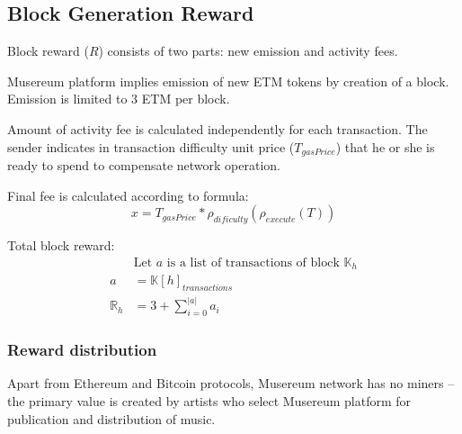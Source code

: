 \documentclass[12pt]{report}
\begin{document}
\begin{figure}[H]
\end{figure}

\vfill\null\pagebreak

\subsection{Block Generation Reward}
\label{tech-blockchain-reward}
\begin{multicols}{2}
Block reward ($R$) consists of two parts: new emission and activity fees.

Musereum platform implies emission of new ETM tokens by creation of a block. Emission is limited to 3 ETM per block.

Amount of activity fee is calculated independently for each transaction. The sender indicates in transaction difficulty unit price ($T_{gasPrice}$) that he or she is ready to spend to compensate network operation.

Final 	fee is calculated according to formula:
\begin{equation}
x = T_{gasPrice} * \rho_{dificulty}(\rho_{execute}(T))
\end{equation}

Total block reward:
\begin{align}
&\text{Let } a \text{ is a list of transactions of block } \mathbb{K}_h \\
a &= \mathbb{K}[h]_{transactions} \\
\mathbb{R}_h &= 3 + \sum\limits_{i=0}^{|a|} a_i
\end{align}
\end{multicols}

\subsubsection{Reward distribution}
\label{tech-blockchain-reward-distribution}
Apart from Ethereum and Bitcoin protocols, Musereum network has no miners – the primary value is created by artists who select Musereum platform for publication and distribution of music.
\end{document}
